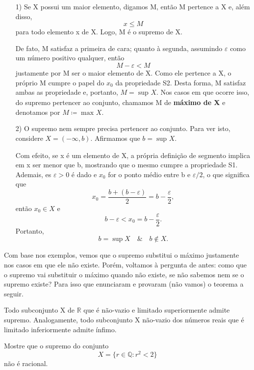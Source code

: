 \documentclass[../analysisII_notes.tex]{subfiles}
\begin{document}
\begin{example}
	\begin{itemize}
		\item[1)] Se X possui um maior elemento, digamos M, então M pertence a X e, além disso,
		      \[
			      x\leq M
		      \]
		      para todo elemento x de X. Logo, M é o supremo de X.

		      De fato, M satisfaz a primeira de cara; quanto à segunda, assumindo \(\varepsilon \) como um número positivo qualquer, então
		      \[
			      M - \varepsilon < M
		      \]
		      justamente por M ser o maior elemento de X. Como ele pertence a X, o próprio M cumpre o papel do \(x_{0}\) da propriedade S2. Desta forma, M
		      satisfaz ambas as propriedade e, portanto, \(M = \sup_{}X\). Nos casos em que ocorre isso, do supremo pertencer ao conjunto, chamamos M de \textbf{máximo de X} e denotamos por \(M\coloneqq \max_{}X\).

		\item[2)] O supremo nem sempre precisa pertencer ao conjunto. Para ver isto, considere \(X = (-\infty, b)\). Afirmamos que \(b = \sup_{}X.\)

		      Com efeito, se x é um elemento de X, a própria definição de segmento implica em x ser menor que b, mostrando que o mesmo cumpre a propriedade S1. Ademais, es \(\varepsilon  > 0\) é dado e \(x_{0}\) for o ponto médio entre b e \(\varepsilon/2 \), o que significa que
		      \[
			      x_{0} = \frac{b+(b-\varepsilon )}{2} = b - \frac{\varepsilon }{2},
		      \]
		      então \(x_{0}\in X\) e
		      \[
			      b-\varepsilon  < x_{0} = b-\frac{\varepsilon}{2}.
		      \]
		      Portanto,
		      \[
			      b = \sup_{}X \quad\&\quad b\not\in X.
		      \]
	\end{itemize}
\end{example}

Com base nos exemplos, vemos que o supremo substitui o máximo justamente nos casos em que ele não existe. Porém, voltamos à pergunta de antes: como que o supremo vai substituir o máximo quando não existe, se não sabemos nem se o supremo existe?
Para isso que enunciaram e provaram (não vamos) o teorema a seguir.
\hypertarget{lub_property}{
	\begin{theorem*}
		Todo subconjunto X de \(\mathbb{R}\) que é não-vazio e limitado superiormente admite supremo. Analogamente, todo subconjunto X não-vazio dos números reais que é limitado inferiormente admite ínfimo.
	\end{theorem*}
}
\begin{exr}
	Mostre que o supremo do conjunto
	\[
		X = \{r\in \mathbb{Q}:r^{2} < 2\}
	\]
	não é racional.
\end{exr}
\end{document}
